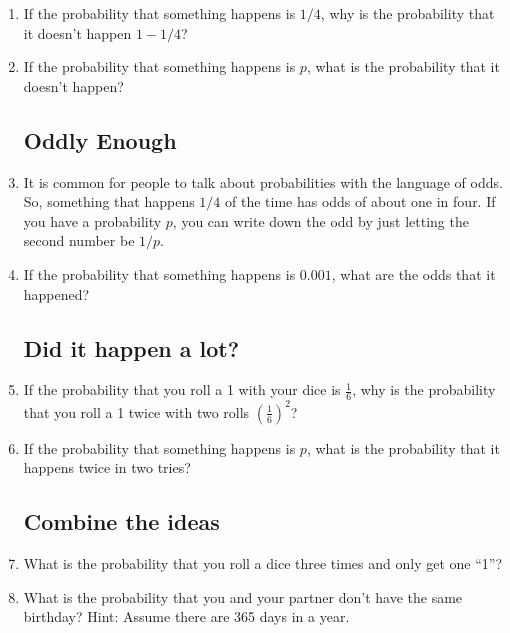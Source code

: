 

\begin{enumerate}
\subsection{Did it happen or not?}
	\item If the probability that something happens is $1/4$, why is the probability that it doesn't happen $1-1/4$? \vfill
	
	\item If the probability that something happens is $p$, what is the probability that it doesn't happen? \vfill
	
	\subsection{Oddly Enough}
	\item It is common for people to talk about probabilities with the language of odds. So, something that happens $1/4$ of the time has odds of about one in four.  If you have a probability $p$, you can write down the odd by just letting the second number be $1/p$.
	
	\item If the probability that something happens is $0.001$, what are the odds that it happened? \vfill
	
\subsection{Did it happen a lot?}
	
	\item If the probability that you roll a 1 with your dice is $\frac{1}{6}$, why is the probability that you roll a 1 twice with two rolls $(\frac{1}{6})^2$? \vfill
	
	\item If the probability that something happens is $p$, what is the probability that it happens twice in two tries?
	
\subsection{Combine the ideas}

	\item What is the probability that you roll a dice three times and only get one ``1''? \vfill
	
	\item What is the probability that you and your partner don't have the same birthday? Hint: Assume there are 365 days in a year. \vfill
	

\end{enumerate}
